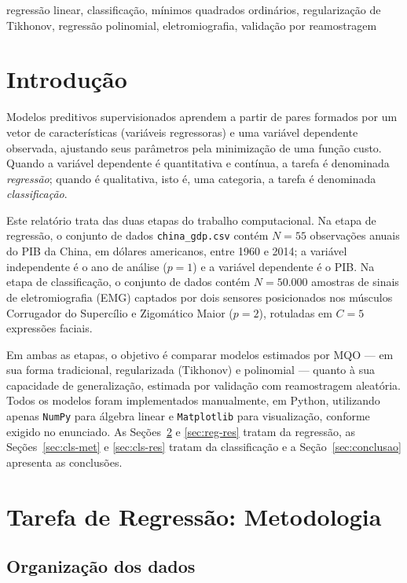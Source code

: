 \documentclass[conference]{IEEEtran}
\begin{document}
\begin{IEEEkeywords}
regressão linear, classificação, mínimos quadrados ordinários, regularização
de Tikhonov, regressão polinomial, eletromiografia, validação por reamostragem
\end{IEEEkeywords}

\section{Introdução}

Modelos preditivos supervisionados aprendem a partir de pares formados por um
vetor de características (variáveis regressoras) e uma variável dependente
observada, ajustando seus parâmetros pela minimização de uma função custo.
Quando a variável dependente é quantitativa e contínua, a tarefa é denominada
\textit{regressão}; quando é qualitativa, isto é, uma categoria, a tarefa é
denominada \textit{classificação}.

Este relatório trata das duas etapas do trabalho computacional. Na etapa de
regressão, o conjunto de dados \texttt{china\_gdp.csv} contém $N = 55$
observações anuais do PIB da China, em dólares americanos, entre 1960 e 2014;
a variável independente é o ano de análise ($p = 1$) e a variável dependente é
o PIB. Na etapa de classificação, o conjunto de dados contém $N = 50.000$
amostras de sinais de eletromiografia (EMG) captados por dois sensores
posicionados nos músculos Corrugador do Supercílio e Zigomático Maior
($p = 2$), rotuladas em $C = 5$ expressões faciais.

Em ambas as etapas, o objetivo é comparar modelos estimados por MQO --- em sua
forma tradicional, regularizada (Tikhonov) e polinomial --- quanto à sua
capacidade de generalização, estimada por validação com reamostragem
aleatória. Todos os modelos foram implementados manualmente, em Python,
utilizando apenas \texttt{NumPy} para álgebra linear e \texttt{Matplotlib}
para visualização, conforme exigido no enunciado. As
Seções~\ref{sec:reg-met} e \ref{sec:reg-res} tratam da regressão, as
Seções~\ref{sec:cls-met} e \ref{sec:cls-res} tratam da classificação e a
Seção~\ref{sec:conclusao} apresenta as conclusões.

\section{Tarefa de Regressão: Metodologia}
\label{sec:reg-met}

\subsection{Organização dos dados}
\end{document}
